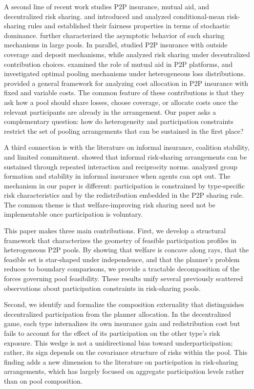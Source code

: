 \documentclass[a4paper,12pt]{article}
\theoremstyle{definition}
\theoremstyle{remark}
\newcommand{\1}{\mathbf{1}}
\begin{document}
A second line of recent work studies P2P insurance, mutual aid, and decentralized risk sharing. \citet{DenuitDhaene2012} and \citet{Denuit2019} introduced and analyzed conditional-mean risk-sharing rules and established their fairness properties in terms of stochastic dominance. \citet{DenuitEtAl2023} further characterized the asymptotic behavior of such sharing mechanisms in large pools. In parallel, \citet{abdikerimova2022peer} studied P2P insurance with outside coverage and deposit mechanisms, while \citet{FengEtAl2023} analyzed risk sharing under decentralized contribution choices. \citet{LevantesiPiscopo2022} examined the role of mutual aid in P2P platforms, and \citet{ChenFengMaoHu2024} investigated optimal pooling mechanisms under heterogeneous loss distributions. \citet{BoonenChenHu2025} provided a general framework for analyzing cost allocation in P2P insurance with fixed and variable costs. The common feature of these contributions is that they ask how a pool should share losses, choose coverage, or allocate costs once the relevant participants are already in the arrangement. Our paper asks a complementary question: how do heterogeneity and participation constraints restrict the set of pooling arrangements that can be sustained in the first place?

A third connection is with the literature on informal insurance, coalition stability, and limited commitment. \citet{coate1993reciprocity} showed that informal risk-sharing arrangements can be sustained through repeated interaction and reciprocity norms. \citet{genicot2003group} analyzed group formation and stability in informal insurance when agents can opt out. The mechanism in our paper is different: participation is constrained by type-specific risk characteristics and by the redistribution embedded in the P2P sharing rule. The common theme is that welfare-improving risk sharing need not be implementable once participation is voluntary.

This paper makes three main contributions. First, we develop a structural framework that characterizes the geometry of feasible participation profiles in heterogeneous P2P pools. By showing that welfare is concave along rays, that the feasible set is star-shaped under independence, and that the planner's problem reduces to boundary comparisons, we provide a tractable decomposition of the forces governing pool feasibility. These results unify several previously scattered observations about participation constraints in risk-sharing pools.

Second, we identify and formalize the composition externality that distinguishes decentralized participation from the planner allocation. In the decentralized game, each type internalizes its own insurance gain and redistribution cost but fails to account for the effect of its participation on the other type's risk exposure. This wedge is not a unidirectional bias toward underparticipation; rather, its sign depends on the covariance structure of risks within the pool. This finding adds a new dimension to the literature on participation in risk-sharing arrangements, which has largely focused on aggregate participation levels rather than on pool composition.
\end{document}

